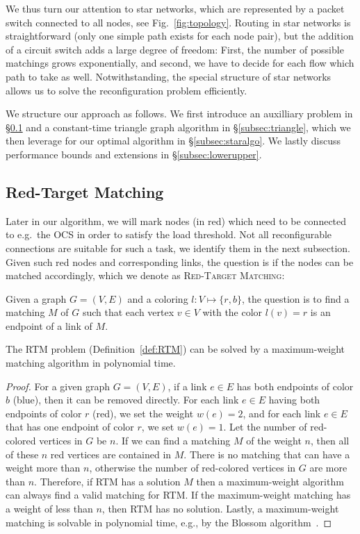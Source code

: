 \documentclass[sigconf]{acmart}
\begin{document}
We thus turn our attention to star networks, which are represented by a packet switch connected to all nodes, see Fig.~\ref{fig:topology}.
%
Routing in star networks is straightforward (only one simple path exists for each node pair), but the addition of a circuit switch adds a large degree of freedom:
%
First, the number of possible matchings grows exponentially, and second, we have to decide for each flow which path to take as well.
%
Notwithstanding, the special structure of star networks allows us to solve the reconfiguration problem efficiently.
%

%
We structure our approach as follows.
We first introduce an auxilliary problem in \S\ref{subsec:rtm} and a constant-time triangle graph algorithm in \S\ref{subsec:triangle}, which we then leverage for our optimal algorithm in \S\ref{subsec:staralgo}.
We lastly discuss performance bounds and extensions in \S\ref{subsec:lowerupper}.

\subsection{Red-Target Matching}\label{subsec:rtm}
Later in our algorithm, we will mark nodes (in red) which need to be connected to e.g.\ the OCS in order to satisfy the load threshold.
Not all reconfigurable connections are suitable for such a task, we identify them in the next subsection.
Given such red nodes and corresponding links, the question is if the nodes can be matched accordingly, which we denote as \textsc{Red-Target Matching}:

\begin{definition}
	Given a graph $G=(V,E)$ and a coloring $l: V\mapsto \{r,b\}$, the question is to find a matching $M$ of $G$ such that each vertex $v\in V$ with the color $l(v)=r$ is an endpoint of a link of $M$. \label{def:RTM}
\end{definition}


\begin{lemma}
	The \textsc{RTM} problem (Definition~\ref{def:RTM}) can be solved by a maximum-weight matching algorithm in polynomial time. \label{lem:RTM}
\end{lemma}
\begin{proof}
	For a given graph $G=(V,E)$, if a link $e\in E$ has  both endpoints of  color $b$ (blue), then it can be removed directly. For each link $e\in E$ having both endpoints of color $r$ (red), we set the weight $w(e)=2$, and for each link $e\in E$ that has one endpoint of color $r$, we set  $w(e)=1$. 
	Let the number of red-colored vertices in $G$ be $n$. 
	If we can find a matching $M$ of the weight $n$, then all of these $n$ red vertices are contained in $M$. 
	There is no matching that can have a weight more than $n$, otherwise the number of red-colored vertices in $G$ are more than $n$.
	Therefore, if RTM has a solution $M$ then a maximum-weight algorithm can always find a valid matching for RTM.
	If the maximum-weight matching has a weight of less than $n$, then RTM has no solution. 
	Lastly, a maximum-weight matching is solvable in polynomial time, e.g., by the Blossom algorithm~\cite{Edmonds1965}.
\end{proof}
\end{document}
